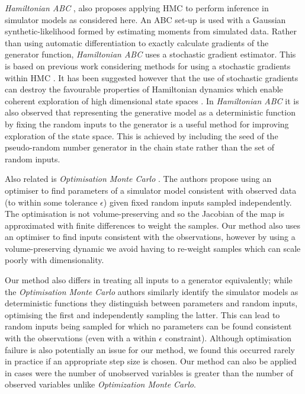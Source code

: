 
\emph{Hamiltonian ABC} \cite{meeds2015hamiltonian}, also proposes applying \ac{HMC} to perform inference in simulator models as considered here. An {ABC} set-up is used with a Gaussian synthetic-likelihood formed by estimating moments from simulated data. Rather than using automatic differentiation to exactly calculate gradients of the generator function, \emph{Hamiltonian ABC} uses a stochastic gradient estimator. This is based on previous work considering methods for using a stochastic gradients within \ac{HMC} \citep{welling2011bayesian,chen2014stochastic}. It has been suggested however that the use of stochastic gradients can destroy the favourable properties of Hamiltonian dynamics which enable coherent exploration of high dimensional state spaces \citep{betancourt2015fundamental}. In \emph{Hamiltonian ABC} it is also observed that representing the generative model as a deterministic function by fixing the random inputs to the generator is a useful method for improving exploration of the state space. This is achieved by including the seed of the pseudo-random number generator in the chain state rather than the set of random inputs.

Also related is \emph{Optimisation Monte Carlo} \citep{meeds2015optimization}. The authors propose using an optimiser to find parameters of a simulator model consistent with observed data (to within some tolerance $\epsilon$) given fixed random inputs sampled independently. The optimisation is not volume-preserving and so the Jacobian of the map is approximated with finite differences to weight the samples. Our method also uses an optimiser to find inputs consistent with the observations, however by using a volume-preserving dynamic we avoid having to re-weight samples which can scale poorly with dimensionality. 

Our method also differs in treating all inputs to a generator equivalently; while the \emph{Optimisation Monte Carlo} authors similarly identify the simulator models as deterministic functions they distinguish between parameters and random inputs, optimising the first and independently sampling the latter. This can lead to random inputs being sampled for which no parameters can be found consistent with the observations (even with a within $\epsilon$ constraint). Although optimisation failure is also potentially an issue for our method, we found this occurred rarely in practice if an appropriate step size is chosen. Our method can also be applied in cases were the number of unobserved variables is greater than the number of observed variables unlike \emph{Optimization Monte Carlo}.

